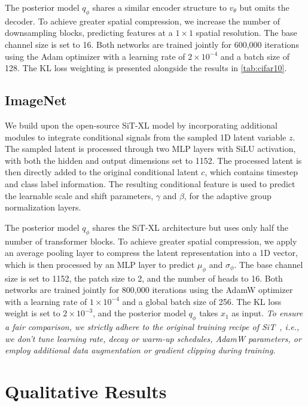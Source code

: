 The posterior model \(q_\phi\) shares a similar encoder structure to \(v_\theta\) but omits the decoder. To achieve greater spatial compression, we increase the number of downsampling blocks, predicting features at a \(1 \times 1\) spatial resolution. The base channel size is set to 16. Both networks are trained jointly for 600,000 iterations using the Adam optimizer with a learning rate of \(2 \times 10^{-4}\) and a batch size of 128. The KL loss weighting is presented alongside the results in \cref{tab:cifar10}.


\subsection{ImageNet}
\label{app:implement_imagenet}
We build upon the open-source SiT-XL model \cite{ma2024sit} by incorporating additional modules to integrate conditional signals from the sampled 1D latent variable \( z \). The sampled latent is processed through two MLP layers with SiLU activation, with both the hidden and output dimensions set to 1152. The processed latent is then directly added to the original conditional latent \( c \), which contains timestep and class label information. The resulting conditional feature is used to predict the learnable scale and shift parameters, \( \gamma \) and \( \beta \), for the adaptive group normalization layers.  

The posterior model \( q_\phi \) shares the SiT-XL architecture but uses only half the number of transformer blocks. To achieve greater spatial compression, we apply an average pooling layer to compress the latent representation into a 1D vector, which is then processed by an MLP layer to predict \( \mu_\phi \) and \( \sigma_\phi \). The base channel size is set to 1152, the patch size to 2, and the number of heads to 16. Both networks are trained jointly for 800,000 iterations using the AdamW optimizer with a learning rate of \( 1 \times 10^{-4} \) and a global batch size of 256. The KL loss weight is set to \( 2 \times 10^{-3} \), and the posterior model \( q_\phi \) takes \( x_1 \) as input. \textit{To ensure a fair comparison, we strictly adhere to the original training recipe of SiT~\cite{ma2024sit}, i.e., we don't tune learning rate, decay or warm-up schedules, AdamW parameters, or employ additional data augmentation or gradient clipping during training.} 

\section{Qualitative Results}
\label{app:addqual}
